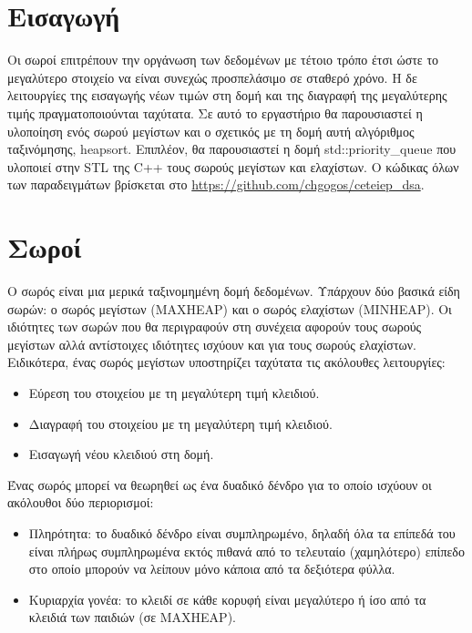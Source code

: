 \section{Εισαγωγή}
Οι σωροί επιτρέπουν την οργάνωση των δεδομένων με τέτοιο τρόπο έτσι ώστε το μεγαλύτερο στοιχείο να είναι συνεχώς προσπελάσιμο σε σταθερό χρόνο. Η δε λειτουργίες της εισαγωγής νέων τιμών στη δομή και της διαγραφή της μεγαλύτερης τιμής πραγματοποιούνται ταχύτατα. Σε αυτό το εργαστήριο θα παρουσιαστεί η υλοποίηση ενός σωρού μεγίστων και ο σχετικός με τη δομή αυτή αλγόριθμος ταξινόμησης, heapsort. Επιπλέον, θα παρουσιαστεί η δομή std::priority\_queue που υλοποιεί στην STL της C++ τους σωρούς μεγίστων και ελαχίστων. Ο κώδικας όλων των παραδειγμάτων βρίσκεται στο \href{https://github.com/chgogos/ceteiep_dsa}{https://github.com/chgogos/ceteiep\_dsa}.

\section{Σωροί}
Ο σωρός είναι μια μερικά ταξινομημένη δομή δεδομένων. Υπάρχουν δύο βασικά είδη σωρών: ο σωρός μεγίστων (MAXHEAP) και ο σωρός ελαχίστων (MINHEAP). Οι ιδιότητες των σωρών που θα περιγραφούν στη συνέχεια αφορούν τους σωρούς μεγίστων αλλά αντίστοιχες ιδιότητες ισχύουν και για τους σωρούς ελαχίστων. Ειδικότερα, ένας σωρός μεγίστων υποστηρίζει ταχύτατα τις ακόλουθες λειτουργίες:
\begin{itemize}[noitemsep]
\item Εύρεση του στοιχείου με τη μεγαλύτερη τιμή κλειδιού.
\item Διαγραφή του στοιχείου με τη μεγαλύτερη τιμή κλειδιού.
\item Εισαγωγή νέου κλειδιού στη δομή.
\end{itemize}

Ένας σωρός μπορεί να θεωρηθεί ως ένα δυαδικό δένδρο για το οποίο ισχύουν οι ακόλουθοι δύο περιορισμοί:
\begin{itemize}[noitemsep]
\item	Πληρότητα: το δυαδικό δένδρο είναι συμπληρωμένο, δηλαδή όλα τα επίπεδά του είναι πλήρως συμπληρωμένα εκτός πιθανά από το τελευταίο (χαμηλότερο) επίπεδο στο οποίο μπορούν να λείπουν μόνο κάποια από τα δεξιότερα φύλλα.
\item	Κυριαρχία γονέα: το κλειδί σε κάθε κορυφή είναι μεγαλύτερο ή ίσο από τα κλειδιά των παιδιών (σε MAXHEAP).
\end{itemize}


